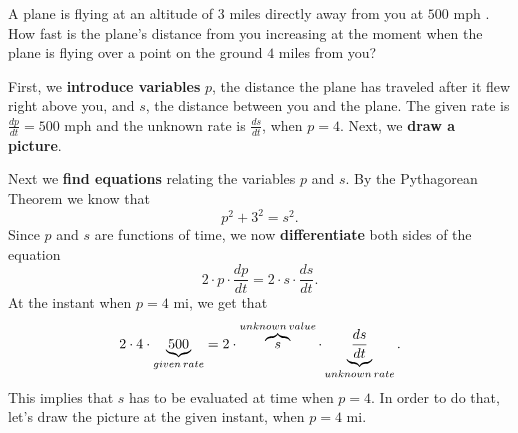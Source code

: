 \documentclass{ximera}
\begin{document}
\begin{example}
A plane is flying at an altitude of $3$ miles directly away from you at $500$ mph
.  How fast is the plane's distance from you increasing at
the moment when the plane is flying over a point on the ground $4$
miles from you?


\begin{explanation}
 First, we \textbf{introduce variables} $p$, the distance the plane has traveled after  it flew right above you, and $s$, the distance between you and the plane.
The given rate is $\frac{dp}{dt}=500$ mph and the unknown rate is $\frac{ds}{dt}$, when $p=4$.
Next, we \textbf{draw a picture}.
\begin{image}
\end{image}
Next we \textbf{find equations} relating the variables $p$ and $s$. By the Pythagorean Theorem
we know that
\[
p^2+3^2=s^2.
\]
Since  $p$ and $s$ are functions of time, we now
\textbf{differentiate} both sides of the equation
\[
2\cdot p\cdot \frac{dp}{dt}  = 2\cdot s \cdot \frac{ds}{dt}.
\]
At the instant when  $p=4$ mi, we get that
\[
2\cdot4\cdot\underbrace{ 500}_{given\hspace{0.02in}rate}  = 2\cdot \overbrace{s}^{unknown\hspace{0.02in}value} \cdot \underbrace{\frac{ds}{dt}}_{unknown\hspace{0.02in}rate} .
\]
 This implies that $s$ has to be evaluated at time when $p=4$. In order to do that,
 let's draw the picture at the given instant, when $p=4$ mi.
\begin{image}
\end{image}
\end{explanation}
\end{example}
\end{document}
